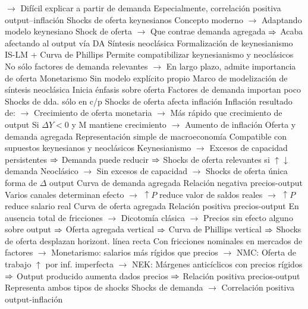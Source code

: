 \documentclass{nuevotema}
\begin{document}
\begin{esquemal}
				\4[] $\to$ Difícil explicar a partir de demanda
				\4[] Especialmente, correlación positiva output--inflación
				\4 Shocks de oferta keynesianos
				\4[] Concepto moderno
				\4[] $\to$ Adaptando modelo keynesiano
				\4[] Shock de oferta
				\4[] $\to$ Que contrae demanda agregada
				\4[] $\Rightarrow$ Acaba afectando al output vía DA
			\3 Síntesis neoclásica
				\4 Formalización de keynesianismo
				\4[] IS-LM + Curva de Phillips
				\4 Permite compatibilizar keynesianismo y neoclásicos
				\4[] No sólo factores de demanda relevantes
				\4[] $\to$ En largo plazo, admite importancia de oferta
			\3 Monetarismo
				\4 Sin modelo explícito propio
				\4[] Marco de modelización de síntesis neoclásica
				\4 Inicia énfasis sobre oferta
				\4[] Factores de demanda importan poco
				\4 Shocks de dda. sólo en c/p
				\4 Shocks de oferta afecta inflación
				\4[] Inflación resultado de:
				\4[] $\to$ Crecimiento de oferta monetaria
				\4[] $\to$ Más rápido que crecimiento de output
				\4[] Si $\Delta Y <0$ y M mantiene crecimiento
				\4[] $\to$ Aumento de inflación
			\3 Oferta y demanda agregada
				\4 Representación simple de macroeconomía
				\4 Compatible con supuestos keynesianos y neoclásicos
				\4[] Keynesianismo
				\4[] $\to$ Excesos de capacidad persistentes
				\4[] $\Rightarrow$ Demanda puede reducir
				\4[] $\Rightarrow$ Shocks de oferta relevantes si $\uparrow \downarrow$ demanda
				\4[] Neoclásico
				\4[] $\to$ Sin excesos de capacidad
				\4[] $\to$ Shocks de oferta única forma de $\Delta$ output
				\4 Curva de demanda agregada
				\4[] Relación negativa precios-output
				\4[] Varios canales determinan efecto
				\4[] $\to$ $\uparrow P$ reduce valor de saldos reales
				\4[] $\to$ $\uparrow P$ reduce salario real
				\4 Curva de oferta agregada
				\4[] Relación positiva precios-output
				\4[] En ausencia total de fricciones
				\4[] $\to$ Dicotomía clásica
				\4[] $\to$ Precios sin efecto alguno sobre output
				\4[] $\Rightarrow$ Oferta agregada vertical
				\4[] $\Rightarrow$ Curva de Phillips vertical
				\4[] $\Rightarrow$ Shocks de oferta desplazan horizont. línea recta
				\4[] Con fricciones nominales en mercados de factores
				\4[] $\to$ Monetarismo: salarios más rígidos que precios
				\4[] $\to$ NMC: Oferta de trabajo $\uparrow$ por inf. imperfecta
				\4[] $\to$ NEK: Márgenes anticíclicos con precios rígidos
				\4[] $\Rightarrow$ Output producido aumenta dados precios
				\4[] $\Rightarrow$ Relación positiva precios-output
				\4 Representa ambos tipos de shocks
				\4[] Shocks de demanda
				\4[] $\to$ Correlación positiva output-inflación
				\4[] 

\end{esquemal}
\end{document}
